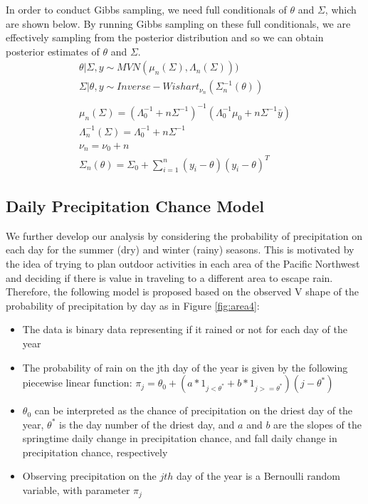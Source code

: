 \documentclass{article}
\begin{document}
In order to conduct Gibbs sampling, we need full conditionals of $\theta$ and $\Sigma$, which are shown below. By running Gibbs sampling on these full conditionals, we are effectively sampling from the posterior distribution and so we can obtain posterior estimates of $\theta$ and $\Sigma$.
\begin{align}
\theta | \Sigma, y \sim MVN(\mu_n(\Sigma), \Lambda_n(\Sigma)))  \nonumber \\
\Sigma | \theta, y \sim Inverse - Wishart_{\nu_n} (\Sigma_n^{-1}(\theta)) \nonumber \\
\nonumber \\
\mu_n(\Sigma) =(\Lambda_0^{-1} + n\Sigma^{-1})^{-1}(\Lambda_0^{-1}\mu_0 + n\Sigma^{-1}\bar{y}) \nonumber \\
\Lambda_n^{-1}(\Sigma) = \Lambda_0^{-1} + n\Sigma^{-1} \nonumber \\
\nu_n = \nu_0 + n \nonumber \\
\Sigma_n(\theta) = \Sigma_0 + \sum_{i=1}^n(y_i - \theta)(y_i - \theta)^T \nonumber
\end{align}

\subsection{Daily Precipitation Chance Model}

We further develop our analysis by considering the probability of precipitation on each day for the summer (dry) and winter (rainy) seasons. This is motivated by the idea of trying to plan outdoor activities in each area of the Pacific Northwest and deciding if there is value in traveling to a different area to escape rain.
Therefore, the following model is proposed based on the observed V shape of the probability of precipitation by day as in Figure \ref{fig:area4}:
\begin{itemize}
\item The data is binary data representing if it rained or not for each day of the year
\item The probability of rain on the jth day of the year is given by the following piecewise linear function: $\pi_j = \theta_0 + (a * 1_{j < \theta^*} + b*1_{j>=\theta^*})(j - \theta^*)$
\item $\theta_0$ can be interpreted as the chance of precipitation on the driest day of the year, $\theta^*$ is the day number of the driest day, and $a$ and $b$ are the slopes of the springtime daily change in precipitation chance, and fall daily change in precipitation chance, respectively
\item Observing precipitation on the $jth$ day of the year is a Bernoulli random variable, with parameter $\pi_j$
\end{itemize}
\end{document}
